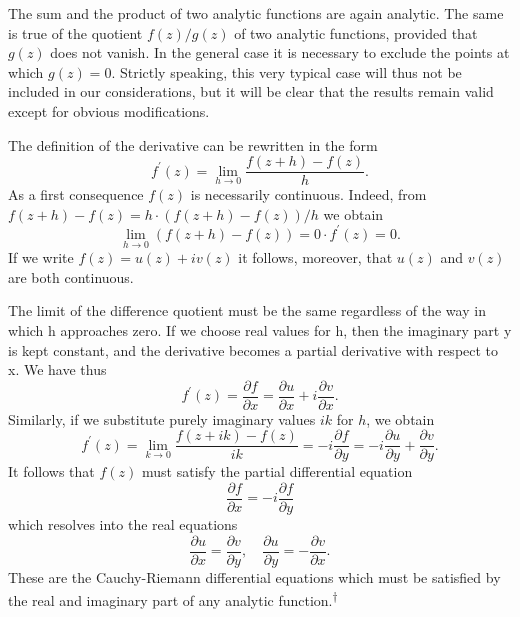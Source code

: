 The sum and the product of two analytic functions are again analytic. The same is true of the quotient $f(z)/g(z)$ of two analytic functions, provided that $g(z)$ does not vanish. In the general case it is necessary to exclude the points at which $g(z)=0$. Strictly speaking, this very typical case will thus not be included in our considerations, but it will be clear that the results remain valid except for obvious modifications.

The definition of the derivative can be rewritten in the form
\begin{equation*}
f ^ {\prime} (z) = \lim _ {h \rightarrow 0} \frac {f (z + h) - f (z)}{h}.
\end{equation*}
As a first consequence $f(z)$ is necessarily continuous. Indeed, from $f(z + h) - f(z) = h \cdot (f(z + h) - f(z)) / h$ we obtain
\begin{equation*}
\lim _ {h \rightarrow 0} (f (z + h) - f (z)) = 0 \cdot f ^ {\prime} (z) = 0.
\end{equation*}
If we write $f(z) = u(z) + iv(z)$ it follows, moreover, that $u(z)$ and $v(z)$ are both continuous.

The limit of the difference quotient must be the same regardless of the way in which h approaches zero. If we choose real values for h, then the imaginary part y is kept constant, and the derivative becomes a partial derivative with respect to x. We have thus
\begin{equation*}
f ^ {\prime} (z) = \frac {\partial f}{\partial x} = \frac {\partial u}{\partial x} + i \frac {\partial v}{\partial x}.
\end{equation*}
Similarly, if we substitute purely imaginary values $ik$ for $h$, we obtain
\begin{equation*}
f ^ {\prime} (z) = \lim _ {k \rightarrow 0} \frac {f (z + i k) - f (z)}{i k} = - i \frac {\partial f}{\partial y} = - i \frac {\partial u}{\partial y} + \frac {\partial v}{\partial y}.
\end{equation*}
It follows that $f(z)$ must satisfy the partial differential equation
\begin{equation*}
\frac {\partial f}{\partial x} = - i \frac {\partial f}{\partial y}\tag{5}\label{eq:2.5}
\end{equation*}
which resolves into the real equations
\begin{equation*}
\frac {\partial u}{\partial x} = \frac {\partial v}{\partial y}, \quad \frac {\partial u}{\partial y} = - \frac {\partial v}{\partial x}.\tag{6}\label{eq:2.6}
\end{equation*}
These are the Cauchy-Riemann differential equations which must be satisfied by the real and imaginary part of any analytic function.\hyperlink{fn:41:dagger}{\textsuperscript{\ensuremath{\dagger}}}

